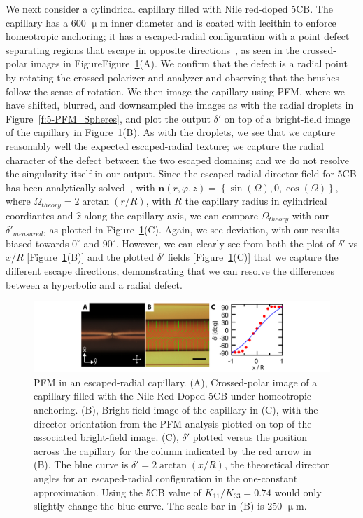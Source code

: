We next consider a cylindrical capillary filled with Nile red-doped 5CB.\@
The capillary has a 600 $\upmu$m inner diameter and is coated with lecithin to enforce homeotropic anchoring; it has a escaped-radial configuration with a point defect separating regions that escape in opposite directions~\cite{RN179}, as seen in the crossed-polar images in FigureFigure~\ref{f:5-PFM_Capillary}(A).
We confirm that the defect is a radial point by rotating the crossed polarizer and analyzer and observing that the brushes follow the sense of rotation.
We then image the capillary using PFM, where we have shifted, blurred, and downsampled the images as with the radial droplets in Figure~\ref{f:5-PFM_Spheres}, and plot the output $\delta'$ on top of a bright-field image of the capillary in Figure~\ref{f:5-PFM_Capillary}(B).
As with the droplets, we see that we capture reasonably well the expected escaped-radial texture; we capture the radial character of the defect between the two escaped domains; and we do not resolve the singularity itself in our output.
Since the escaped-radial director field for 5CB has been analytically solved~, with $\mathbf{n}(r,\varphi,z) = \left \{ \sin(\Omega), 0, \cos(\Omega)   \right \}$, where $\Omega_{theory} = 2 \arctan(r/R) $, with $R$ the capillary radius in cylindrical coordiantes and $\hat{z}$ along the capillary axis, we can compare $\Omega_{theory}$ with our $\delta'_{measured}$, as plotted in Figure~\ref{f:5-PFM_Capillary}(C).
Again, we see deviation, with our results biased towards $0^{\circ}$ and $90^{\circ}$.
However, we can clearly see from both the plot of $\delta'$ vs $x/R$ [Figure~\ref{f:5-PFM_Capillary}(B)] and the plotted $\delta'$ fields [Figure~\ref{f:5-PFM_Capillary}(C)] that we capture the different escape directions, demonstrating that we can resolve the differences between a hyperbolic and a radial defect.
\begin{figure}
  \centering
  \includegraphics{figures/C5/Ch5-Figs_PFM_Capillary.png}
  \caption{PFM in an escaped-radial capillary.
  (A), Crossed-polar image of a capillary filled with the Nile Red-Doped 5CB under homeotropic anchoring.
  (B), Bright-field image of the capillary in (C), with the director orientation from the PFM analysis plotted on top of the associated bright-field image.
  (C), $\delta'$ plotted versus the position across the capillary for the column indicated by the red arrow in (B).
  The blue curve is $\delta' = 2 \arctan (x/R)$, the theoretical director angles for an escaped-radial configuration in the one-constant approximation.
  Using the 5CB value of $K_{11}/K_{33} = 0.74$ would only slightly change the blue curve.
  The scale bar in (B) is 250 $\upmu$m.}\label{f:5-PFM_Capillary}
\end{figure}

